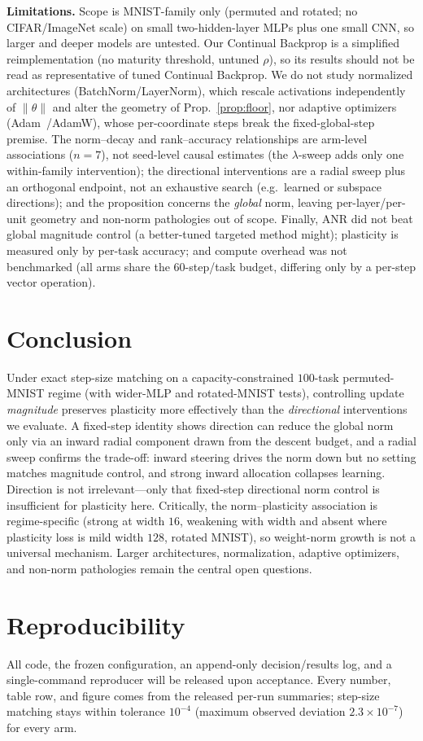 \documentclass[conference]{IEEEtran}
\begin{document}
\textbf{Limitations.} Scope is MNIST-family only (permuted and rotated; no
CIFAR/ImageNet scale) on small two-hidden-layer MLPs plus one small CNN, so larger
and deeper models are untested. {Our Continual Backprop is a simplified
reimplementation (no maturity threshold, untuned $\rho$), so its results should not be
read as representative of tuned Continual Backprop.} We do not study normalized architectures
(BatchNorm/LayerNorm), which rescale activations independently of
$\lVert\theta\rVert$ and alter the geometry of Prop.~\ref{prop:floor}, nor adaptive
optimizers (Adam~\cite{kingma2015adam}/AdamW), whose per-coordinate steps break the
fixed-global-step premise. The norm--decay and rank--accuracy relationships are arm-level associations
($n{=}7$), not seed-level causal estimates (the $\lambda$-sweep adds only one
within-family intervention); the directional interventions are a radial sweep plus an
orthogonal endpoint, not an exhaustive search (e.g.\ learned or subspace directions);
and the proposition concerns the \emph{global} norm, leaving per-layer/per-unit
geometry and non-norm pathologies out of scope. Finally, ANR did not beat global
magnitude control (a better-tuned targeted method might); plasticity is measured only
by per-task accuracy; and compute overhead was not benchmarked (all arms share the
$60$-step/task budget, differing only by a per-step vector operation).

\section{Conclusion}
Under exact step-size matching on a capacity-constrained $100$-task permuted-MNIST
regime (with wider-MLP and rotated-MNIST tests), controlling update \emph{magnitude}
preserves plasticity more effectively than the \emph{directional} interventions we
evaluate. A fixed-step identity shows direction can reduce the global norm only via
an inward radial component drawn from the descent budget, and a radial sweep confirms
the trade-off: inward steering drives the norm down but no setting matches magnitude
control, and strong inward allocation collapses learning. Direction is not
irrelevant---only that fixed-step directional norm control is insufficient for
plasticity here. Critically, the norm--plasticity association is regime-specific
(strong at width $16$, weakening with width and {absent where plasticity loss is
mild width $128$, rotated MNIST}), so weight-norm growth is not a universal
mechanism. Larger
architectures, normalization, adaptive optimizers, and non-norm pathologies remain
the central open questions.

\section*{Reproducibility}
{All code, the frozen configuration, an append-only decision/results log, and a
single-command reproducer will be released upon acceptance. Every number, table row,
and figure comes from the released per-run summaries; step-size matching stays within
tolerance $10^{-4}$ (maximum observed deviation $2.3{\times}10^{-7}$) for every arm.}



\end{document}
